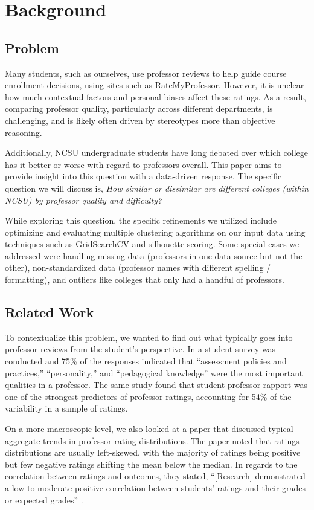 \documentclass[sigconf,nonacm]{acmart}
\begin{document}
\section{Background}

\subsection{Problem}
Many students, such as ourselves, use professor reviews to help guide course enrollment decisions, using sites such as RateMyProfessor. However, it is unclear how much contextual factors and personal biases affect these ratings. As a result, comparing professor quality, particularly across different departments, is challenging, and is likely often driven by stereotypes more than objective reasoning.

Additionally, NCSU undergraduate students have long debated over which college has it better or worse with regard to professors overall. This paper aims to provide insight into this question with a data-driven response. The specific question we will discuss is, \textit{How similar or dissimilar are different colleges (within NCSU) by professor quality and difficulty?}

While exploring this question, the specific refinements we utilized include optimizing and evaluating multiple clustering algorithms on our input data using techniques such as GridSearchCV and silhouette scoring. Some special cases we addressed were handling missing data (professors in one data source but not the other), non-standardized data (professor names with different spelling / formatting), and outliers like colleges that only had a handful of professors.

\subsection{Related Work}
To contextualize this problem, we wanted to find out what typically goes into professor reviews from the student's perspective. In \cite{10.3389/feduc.2022.842640:sourceD} a student survey was conducted and 75\% of the responses indicated that “assessment policies and practices,” “personality,” and “pedagogical knowledge” were the most important qualities in a professor. The same study found that student-professor rapport was one of the strongest predictors of professor ratings, accounting for 54\% of the variability in a sample of ratings.

On a more macroscopic level, we also looked at a paper that discussed typical aggregate trends in professor rating distributions. The paper noted that ratings distributions are usually left-skewed, with the majority of ratings being positive but few negative ratings shifting the mean below the median. In regards to the correlation between ratings and outcomes, they stated, “[Research] demonstrated a low to moderate positive correlation between students’ ratings and their grades or expected grades” \cite{LINSE201794:sourceE}.
\end{document}
